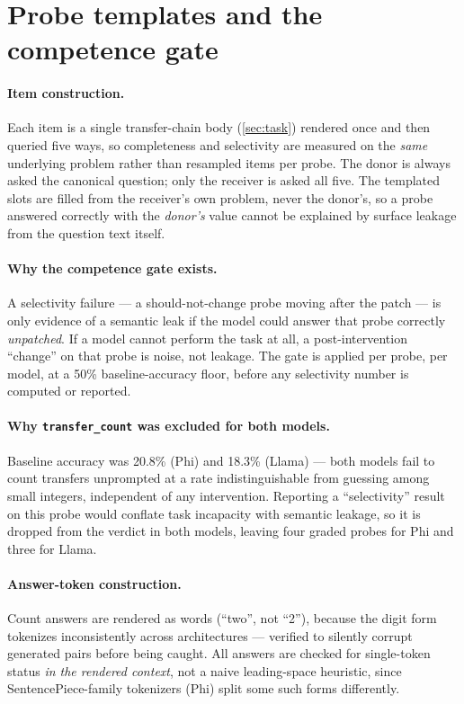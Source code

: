\documentclass[11pt]{article}
\begin{document}


\appendix

\section{Probe templates and the competence gate}
\label{sec:appendix-probes}

\paragraph{Item construction.}
Each item is a single transfer-chain body (\cref{sec:task}) rendered once and
then queried five ways, so completeness and selectivity are measured on the
\emph{same} underlying problem rather than resampled items per probe. The
donor is always asked the canonical question; only the receiver is asked all
five. The templated slots are filled from the receiver's own problem, never
the donor's, so a probe answered correctly with the \emph{donor's} value
cannot be explained by surface leakage from the question text itself.

\paragraph{Why the competence gate exists.}
A selectivity failure --- a should-not-change probe moving after the patch ---
is only evidence of a semantic leak if the model could answer that probe
correctly \emph{unpatched}. If a model cannot perform the task at all, a
post-intervention \enquote{change} on that probe is noise, not leakage. The
gate is applied per probe, per model, at a 50\% baseline-accuracy floor,
before any selectivity number is computed or reported.

\paragraph{Why \texttt{transfer\_count} was excluded for both models.}
Baseline accuracy was 20.8\% (Phi) and 18.3\% (Llama) --- both models fail to
count transfers unprompted at a rate indistinguishable from guessing among
small integers, independent of any intervention. Reporting a
\enquote{selectivity} result on this probe would conflate task incapacity with
semantic leakage, so it is dropped from the verdict in both models, leaving
four graded probes for Phi and three for Llama.

\paragraph{Answer-token construction.}
Count answers are rendered as words (\enquote{two}, not \enquote{2}), because
the digit form tokenizes inconsistently across architectures --- verified to
silently corrupt generated pairs before being caught. All answers are checked
for single-token status \emph{in the rendered context}, not a naive
leading-space heuristic, since SentencePiece-family tokenizers (Phi) split
some such forms differently.
\end{document}
